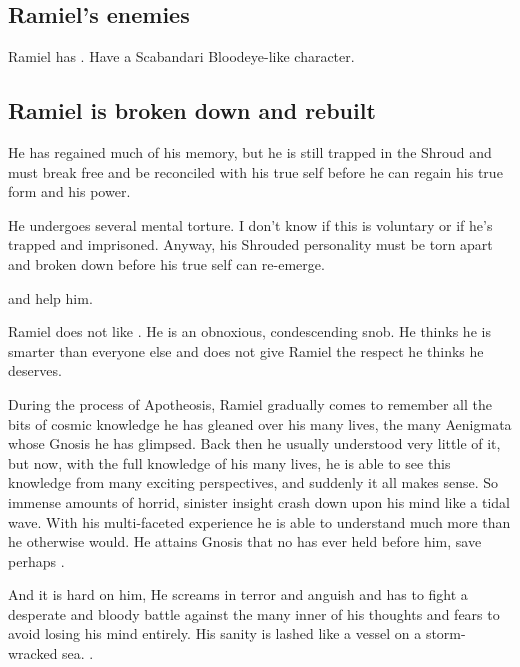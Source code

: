 \subsection{Ramiel's enemies}
Ramiel has . 
Have a Scabandari Bloodeye-like character. 







\subsection{Ramiel is broken down and rebuilt}
He has regained much of his memory, but he is still trapped in the Shroud and must break free and be reconciled with his true self before he can regain his true \resphan{} form and his \sathariah{} power. 

He undergoes several mental torture. I don't know if this is voluntary or if he's trapped and imprisoned. Anyway, his Shrouded personality must be torn apart and broken down before his true self can re-emerge. 

\Cishiel{} and \Gilchad{} help him. 

Ramiel does not like \Gilchad. 
He is an obnoxious, condescending snob. 
He thinks he is smarter than everyone else and does not give Ramiel the respect he thinks he deserves. 

During the process of Apotheosis, Ramiel gradually comes to remember all the bits of cosmic knowledge he has gleaned over his many lives, the many Aenigmata whose Gnosis he has glimpsed. 
Back then he usually understood very little of it, but now, with the full knowledge of his many lives, he is able to see this knowledge from many exciting perspectives, and suddenly it all makes sense.
So immense amounts of horrid, sinister insight crash down upon his mind like a tidal wave.
With his multi-faceted experience he is able to understand much more than he otherwise would.
He attains Gnosis that no \resphan has ever held before him, save perhaps \Azraid.

And it is hard on him,
He screams in terror and anguish and has to fight a desperate and bloody battle against the many inner \daemons of his thoughts and fears to avoid losing his mind entirely.
His sanity is lashed like a vessel on a storm-wracked sea.
. 





